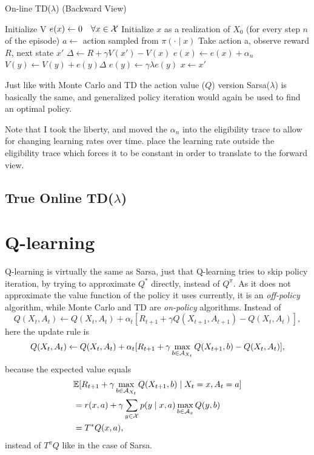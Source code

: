 \begin{algorithm}
	\caption{On-line TD(\(\lambda\)) (Backward View)}
	\begin{algorithmic}
		\State Initialize V
		\State \(e(x)\gets 0 \quad \forall x\in\mathcal{X}\)
			\State Initialize \(x\) as a realization of \(X_0\)
			\Repeat (for every step \(n\) of the episode)
				\State \(a\gets\) action sampled from \(\pi(\cdot \mid x)\) 
				\State Take action a, observe reward \(R\), next state \(x'\)
				\State \(\Delta\gets R + \gamma V(x') -V(x)\) 
				\State \(e(x)\gets e(x) + \alpha_n \)
					\State \(V(y)\gets V(y) + e(y) \Delta  \)
					\State \(e(y) \gets \gamma\lambda e(y)\)
				\EndFor
				\State \(x\gets x'\)
		\EndWhile
	\end{algorithmic}
\end{algorithm}
Just like with Monte Carlo and TD the action value (\(Q\)) version Sarsa(\(\lambda\)) is basically the same, and generalized policy iteration would again be used to find an optimal policy.

Note that I took the liberty, and moved the \(\alpha_n\) into the eligibility trace to allow for changing learning rates over time. \textcite{suttonReinforcementLearningIntroduction1998} place the learning rate outside the eligibility trace which forces it to be constant in order to translate to the forward view. 

\subsection{True Online TD(\(\lambda\))}


\section{Q-learning}
Q-learning \parencite{watkinsLearningDelayedRewards1989} is virtually the same as Sarsa, just that Q-learning tries to skip policy iteration, by trying to approximate \(Q^*\) directly, instead of \(Q^\pi\). As it does not approximate the value function of the policy it uses currently, it is an \emph{off-policy} algorithm, while Monte Carlo and TD are \emph{on-policy} algorithms. Instead of
\[
	Q(X_t,A_t) \gets Q(X_t,A_t) + \alpha_t[R_{t+1}+\gamma Q(X_{t+1},A_{t+1}) -Q(X_t,A_t)],
\]
here the update rule is 
\[
	Q(X_t,A_t) \gets Q(X_t,A_t) + \alpha_t[R_{t+1}+\gamma \max_{b\in\mathcal{A}_{X_t}}Q(X_{t+1}, b) -Q(X_t,A_t)],
\]
because the expected value equals
\begin{align*}
	&\mathbb{E}[R_{t+1}+\gamma \max_{b\in\mathcal{A}_{X_t}}Q(X_{t+1}, b) \mid X_t=x, A_t=a]\\
	&=r(x,a) + \gamma \sum_{y\in\mathcal{X}} p(y\mid x,a) \max_{b\in\mathcal{A}_x} Q(y,b)\\
	&=T^*Q(x,a),
\end{align*}
instead of \(T^\pi Q\) like in the case of Sarsa. 

